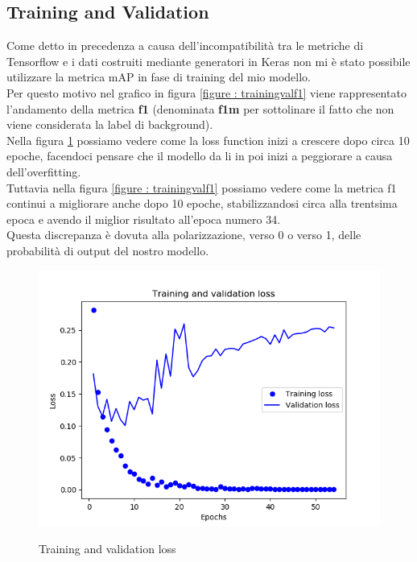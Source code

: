 \subsection{Training and Validation}
Come detto in precedenza a causa dell'incompatibilità tra le metriche di Tensorflow e i dati costruiti mediante generatori in Keras non mi è stato possibile  utilizzare la metrica mAP in fase di training del mio modello.
\\Per questo motivo nel grafico in figura \ref{figure : trainingvalf1} viene rappresentato l'andamento della metrica \textbf{f1} (denominata \textbf{f1m} per sottolinare il fatto che non viene considerata la label di background).
\\Nella figura \ref{figure : trainingvalloss} possiamo vedere come la loss function inizi a crescere dopo circa 10 epoche, facendoci pensare che il modello da li in poi inizi a peggiorare a causa dell'overfitting.
\\Tuttavia nella figura \ref{figure : trainingvalf1} possiamo vedere come la metrica f1 continui a migliorare anche dopo 10 epoche, stabilizzandosi circa alla trentsima epoca e avendo il miglior risultato all'epoca numero 34.
\\Questa discrepanza è dovuta alla polarizzazione, verso 0 o verso 1, delle probabilità di output del nostro modello.
\begin{figure}[ht]
\centering
\caption{Training and validation loss}
\includegraphics[scale=0.7]{img/training-validation-loss.png}
\label{figure : trainingvalloss}
\end{figure}
